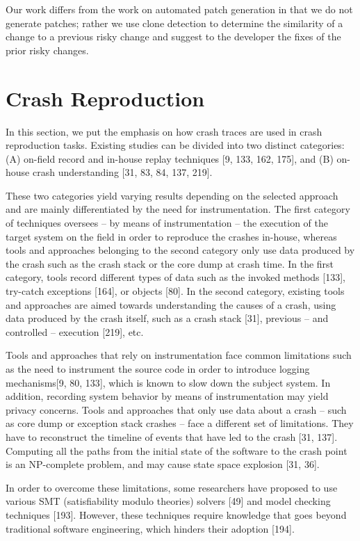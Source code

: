 \documentclass[12pt]{report}
\begin{document}
Our work differs from the work on automated patch generation in that we
do not generate patches; rather we use clone detection to determine the
similarity of a change to a previous risky change and suggest to the
developer the fixes of the prior risky changes.

\section{Crash Reproduction}\label{crash-reproduction}

In this section, we put the emphasis on how crash traces are used in
crash reproduction tasks. Existing studies can be divided into two
distinct categories: (A) on-field record and in-house replay techniques
{[}9, 133, 162, 175{]}, and (B) on-house crash understanding {[}31, 83,
84, 137, 219{]}.

These two categories yield varying results depending on the selected
approach and are mainly differentiated by the need for instrumentation.
The first category of techniques oversees -- by means of instrumentation
-- the execution of the target system on the field in order to reproduce
the crashes in-house, whereas tools and approaches belonging to the
second category only use data produced by the crash such as the crash
stack or the core dump at crash time. In the first category, tools
record different types of data such as the invoked methods {[}133{]},
try-catch exceptions {[}164{]}, or objects {[}80{]}. In the second
category, existing tools and approaches are aimed towards understanding
the causes of a crash, using data produced by the crash itself, such as
a crash stack {[}31{]}, previous -- and controlled -- execution
{[}219{]}, etc.

Tools and approaches that rely on instrumentation face common
limitations such as the need to instrument the source code in order to
introduce logging mechanisms{[}9, 80, 133{]}, which is known to slow
down the subject system. In addition, recording system behavior by means
of instrumentation may yield privacy concerns. Tools and approaches that
only use data about a crash -- such as core dump or exception stack
crashes -- face a different set of limitations. They have to reconstruct
the timeline of events that have led to the crash {[}31, 137{]}.
Computing all the paths from the initial state of the software to the
crash point is an NP-complete problem, and may cause state space
explosion {[}31, 36{]}.

In order to overcome these limitations, some researchers have proposed
to use various SMT (satisfiability modulo theories) solvers {[}49{]} and
model checking techniques {[}193{]}. However, these techniques require
knowledge that goes beyond traditional software engineering, which
hinders their adoption {[}194{]}.
\end{document}
